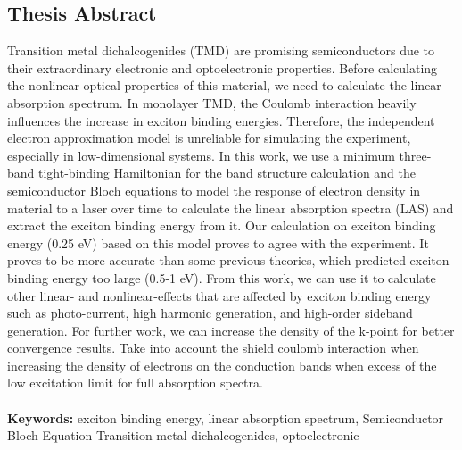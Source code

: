 \documentclass[12pt,english,a4paper]{article}
\begin{document}
	\subsection*{Thesis Abstract}
	\quad Transition metal dichalcogenides (TMD) are promising semiconductors due to their extraordinary electronic and optoelectronic properties. Before calculating the nonlinear optical properties of this material, we need to calculate the linear absorption spectrum. In monolayer TMD, the Coulomb interaction heavily influences the increase in exciton binding energies. Therefore, the independent electron approximation model is unreliable for simulating the experiment, especially in low-dimensional systems. In this work, we use a minimum three-band tight-binding Hamiltonian for the band structure calculation and the semiconductor Bloch equations to model the response of electron density in material to a laser over time to calculate the linear absorption spectra (LAS) and extract the exciton binding energy from it. Our calculation on exciton binding energy (0.25 eV) based on this model proves to agree with the experiment. It proves to be more accurate than some previous theories, which predicted exciton binding energy too large (0.5-1 eV). From this work, we can use it to calculate other linear- and nonlinear-effects that are affected by exciton binding energy such as photo-current, high harmonic generation, and high-order sideband generation. For further work, we can increase the density of the k-point for better convergence results. Take into account the shield coulomb interaction when increasing the density of electrons on the conduction bands when excess of the low excitation limit for full absorption spectra.\\\null
	\\[0.5cm]
	\textbf{Keywords:} exciton binding energy, linear absorption spectrum, Semiconductor Bloch Equation Transition metal dichalcogenides, optoelectronic
\end{document}
